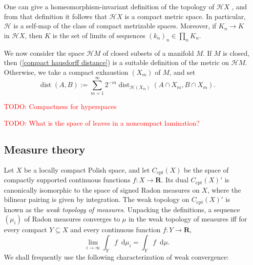 \documentclass[reqno,11pt]{amsart}
\newcommand{\RR}{\mathbf{R}}
\newcommand*\dif{\mathop{}\!\mathrm{d}}
\DeclareMathOperator{\dist}{dist}
\newcommand{\Hypspace}{\mathscr H}
\newcommand{\dfn}[1]{\emph{#1}\index{#1}}
\newcommand{\cpt}{\mathrm{cpt}}
\theoremstyle{definition}
\numberwithin{equation}{section}
\newcommand\todo[1]{\textcolor{red}{TODO: #1}}
\begin{document}
One can give a homeomorphism-invariant definition of the topology of $\Hypspace X$ \cite[Chapter 4]{nadler2017continuum}, and from that definition it follows that $\Hypspace X$ is a compact metric space.
In particular, $\Hypspace$ is a self-map of the class of compact metrizable spaces.
Moreover, if $K_n \to K$ in $\Hypspace X$, then $K$ is the set of limits of sequences $(k_n)_n \in \prod_n K_n$.

We now consider the space $\Hypspace M$ of closed subsets of a manifold $M$.
If $M$ is closed, then (\ref{compact hausdorff distance}) is a suitable definition of the metric on $\Hypspace M$.
Otherwise, we take a compact exhaustion $(X_m)$ of $M$, and set 
$$\dist(A, B) := \sum_{m = 1}^\infty 2^{-m} \dist_{\Hypspace(X_m)} (A \cap X_m, B \cap X_m).$$

\todo{Compactness for hyperspaces}

\todo{What is the space of leaves in a noncompact lamination?}



\subsection{Measure theory}\label{MeasurePrelims}
Let $X$ be a locally compact Polish space, and let $C_\cpt(X)$ be the space of compactly supported continuous functions $f: X \to \RR$.
Its dual $C_\cpt(X)'$ is canonically isomorphic to the space of signed Radon measures on $X$, where the bilinear pairing is given by integration.
The weak topology on $C_\cpt(X)'$ is known as the \dfn{weak topology of measures}.
Unpacking the definitions, a sequence $(\mu_i)$ of Radon measures converges to $\mu$ in the weak topology of measures iff for every compact $Y \subseteq X$ and every continuous function $f: Y \to \RR$,
$$\lim_{i \to \infty} \int_Y f \dif \mu_i = \int_Y f \dif \mu.$$
We shall frequently use the following characterization of weak convergence:
\end{document}
